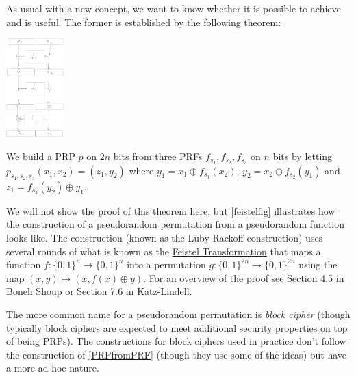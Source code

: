 As usual with a new concept, we want to know whether it is possible to
achieve and is useful. The former is established by the following
theorem:

\hypertarget{PRPfromPRF}{}


\begin{marginfigure}
\centering
\includegraphics[width=\linewidth, height=1.5in, keepaspectratio]{../figure/feistel.jpg}
\caption{We build a PRP \(p\) on \(2n\) bits from three PRFs
\(f_{s_1},f_{s_2},f_{s_3}\) on \(n\) bits by letting
\(p_{s_1,s_2,s_3}(x_1,x_2)=(z_1,y_2)\) where
\(y_1 = x_1 \oplus f_{s_1}(x_2)\), \(y_2 = x_2 \oplus f_{s_2}(y_1)\) and
\(z_1 = f_{s_3}(y_2) \oplus y_1\).}
\label{feistelfig}
\end{marginfigure}

We will not show the proof of this theorem here, but \cref{feistelfig}
illustrates how the construction of a pseudorandom permutation from a
pseudorandom function looks like. The construction (known as the
Luby-Rackoff construction) uses several rounds of what is known as the
\href{https://en.wikipedia.org/wiki/Feistel_cipher}{Feistel
Transformation} that maps a function
\(f:\{0,1\}^n \rightarrow \{0,1\}^n\) into a permutation
\(g:\{0,1\}^{2n} \rightarrow \{0,1\}^{2n}\) using the map
\((x,y) \mapsto (x,f(x) \oplus y)\). For an overview of the proof see
Section 4.5 in Boneh Shoup or Section 7.6 in Katz-Lindell.

The more common name for a pseudorandom permutation is \emph{block
cipher} (though typically block ciphers are expected to meet additional
security properties on top of being PRPs). The constructions for block
ciphers used in practice don't follow the construction of
\cref{PRPfromPRF} (though they use some of the ideas) but have a more
ad-hoc nature.

